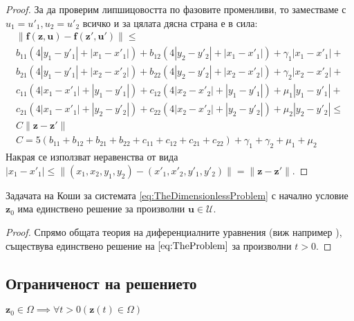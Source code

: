 \begin{proof}
  За да проверим липшицовостта по фазовите променливи, то заместваме с $u_1 = u'_1, u_2 = u'_2$ всичко и за цялата дясна страна е в сила:
  \begin{multline}
  \label{eq:LipschitzContinuity}
    \|\mathbf{f}(\mathbf{z}, \mathbf{u}) - \mathbf{f}(\mathbf{z}', \mathbf{u}')\| \leq \\
    b_{11} (4 |y_1 - y'_1| + |x_1 - x'_1|) +
    b_{12} (4 |y_2 - y'_2| + |x_1 - x'_1|) + \gamma_1 |x_1-x'_1| + \\
    b_{21} (4 |y_1 - y'_1| + |x_2 - x'_2|) +
    b_{22} (4 |y_2 - y'_2| + |x_2 - x'_2|) + \gamma_2 |x_2-x'_2| + \\
    c_{11} (4 |x_1 - x'_1| + |y_1 - y'_1|) +
    c_{12} (4 |x_2 - x'_2| + |y_1 - y'_1|) + \mu_1 |y_1 - y'_1| + \\
    c_{21} (4 |x_1 - x'_1| + |y_2 - y'_2|) +
    c_{22} (4 |x_2 - x'_2| + |y_2 - y'_2|) + \mu_2 |y_2 - y'_2| \leq \\
    C \|\mathbf{z} - \mathbf{z}'\| \\
    C = 5 (b_{11} + b_{12} + b_{21} + b_{22} + c_{11} + c_{12} + c_{21} + c_{22}) + \gamma_1 + \gamma_2 + \mu_1 + \mu_2
  \end{multline}
  Накрая се използват неравенства от вида $|x_1-x'_1| \leq \|(x_1, x_2, y_1, y_2) - (x'_1, x'_2, y'_1, y'_2)\| = \|\mathbf{z} - \mathbf{z}'\|$.
\end{proof}

\begin{corollary}
\label{cor:ExistanceAndUniqueness}
Задачата на Коши за системата \eqref{eq:TheDimensionlessProblem} с начално условие $\mathbf{z}_0$ има единствено решение за произволни $\mathbf{u} \in \mathscr{U}$.
\end{corollary}

\begin{proof}
  Спрямо общата теория на диференциалните уравнения (виж например \cite[глава~I]{Hale1980}), съществува единствено решение на $\eqref{eq:TheProblem}$ за произволни $t>0$.
\end{proof}

\subsection{Ограниченост на решението}

\begin{proposition}
  $\mathbf{z}_0 \in \Omega \implies \forall{t>0}\left(\mathbf{z}(t) \in \Omega\right)$
\end{proposition}

